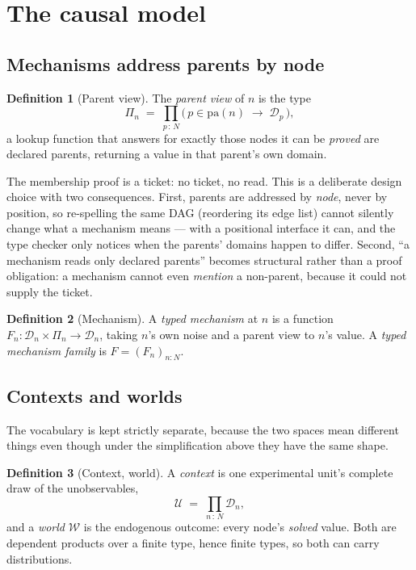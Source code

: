 \documentclass[11pt,a4paper]{article}
\theoremstyle{definition}
\newtheorem{definition}{Definition}[section]
\theoremstyle{plain}
\theoremstyle{remark}
\newcommand{\pa}{\mathrm{pa}}
\newcommand{\dom}{\mathcal{D}}
\newcommand{\Ctx}{\mathcal{U}}         %
\newcommand{\Wld}{\mathcal{W}}         %
\newcommand{\pv}{\Pi}                  %
\begin{document}
\section{The causal model}

\subsection{Mechanisms address parents by node}

\begin{definition}[Parent view]
The \emph{parent view} of $n$ is the type
\[
  \pv_n \;=\; \prod_{p \,:\, N} \bigl(\, p \in \pa(n) \;\to\; \dom_p \,\bigr),
\]
a lookup function that answers for exactly those nodes it can be
\emph{proved} are declared parents, returning a value in that parent's own
domain.
\end{definition}

The membership proof is a ticket: no ticket, no read. This is a deliberate
design choice with two consequences. First, parents are addressed by
\emph{node}, never by position, so re-spelling the same DAG (reordering its
edge list) cannot silently change what a mechanism means --- with a
positional interface it can, and the type checker only notices when the
parents' domains happen to differ. Second, ``a mechanism reads only
declared parents'' becomes structural rather than a proof obligation: a
mechanism cannot even \emph{mention} a non-parent, because it could not
supply the ticket.

\begin{definition}[Mechanism]
A \emph{typed mechanism} at $n$ is a function
$F_n : \dom_n \times \pv_n \to \dom_n$, taking $n$'s own noise and a parent
view to $n$'s value. A \emph{typed mechanism family} is $F = (F_n)_{n:N}$.
\end{definition}

\subsection{Contexts and worlds}

The vocabulary is kept strictly separate, because the two spaces mean
different things even though under the simplification above they have the
same shape.

\begin{definition}[Context, world]
A \emph{context} is one experimental unit's complete draw of the
unobservables,
\[
  \Ctx \;=\; \prod_{n\,:\,N} \dom_n ,
\]
and a \emph{world} $\Wld$ is the endogenous outcome: every node's
\emph{solved} value. Both are dependent products over a finite type, hence
finite types, so both can carry distributions.
\end{definition}
\end{document}
